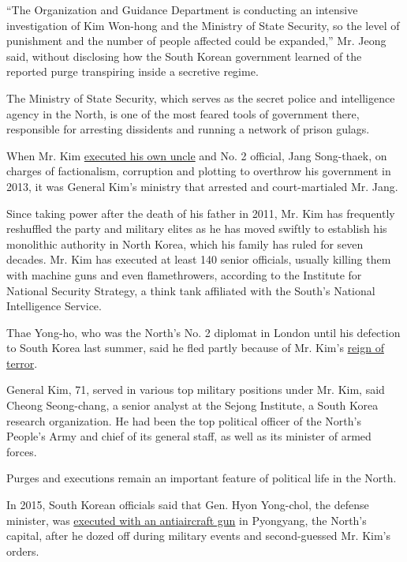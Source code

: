 ``The Organization and Guidance Department is conducting an intensive
investigation of Kim Won-hong and the Ministry of State Security, so the
level of punishment and the number of people affected could be
expanded,'' Mr. Jeong said, without disclosing how the South Korean
government learned of the reported purge transpiring inside a secretive
regime.

The Ministry of State Security, which serves as the secret police and
intelligence agency in the North, is one of the most feared tools of
government there, responsible for arresting dissidents and running a
network of prison gulags.

When Mr. Kim
\href{http://www.nytimes3xbfgragh.onion/2013/12/14/world/asia/execution-raises-doubts-about-kims-grip-on-north-korea.html}{executed
his own uncle} and No. 2 official, Jang Song-thaek, on charges of
factionalism, corruption and plotting to overthrow his government in
2013, it was General Kim's ministry that arrested and court-martialed
Mr. Jang.

Since taking power after the death of his father in 2011, Mr. Kim has
frequently reshuffled the party and military elites as he has moved
swiftly to establish his monolithic authority in North Korea, which his
family has ruled for seven decades. Mr. Kim has executed at least 140
senior officials, usually killing them with machine guns and even
flamethrowers, according to the Institute for National Security
Strategy, a think tank affiliated with the South's National Intelligence
Service.

Thae Yong-ho, who was the North's No. 2 diplomat in London until his
defection to South Korea last summer, said he fled partly because of Mr.
Kim's
\href{https://www.nytimes3xbfgragh.onion/2017/01/25/world/asia/north-korea-defector.html}{reign
of terror}.

General Kim, 71, served in various top military positions under Mr. Kim,
said Cheong Seong-chang, a senior analyst at the Sejong Institute, a
South Korea research organization. He had been the top political officer
of the North's People's Army and chief of its general staff, as well as
its minister of armed forces.

Purges and executions remain an important feature of political life in
the North.

In 2015, South Korean officials said that Gen. Hyon Yong-chol, the
defense minister, was
\href{https://www.nytimes3xbfgragh.onion/2015/05/13/world/asia/north-korea-said-to-execute-a-top-official.html}{executed
with an antiaircraft gun} in Pyongyang, the North's capital, after he
dozed off during military events and second-guessed Mr. Kim's orders.

